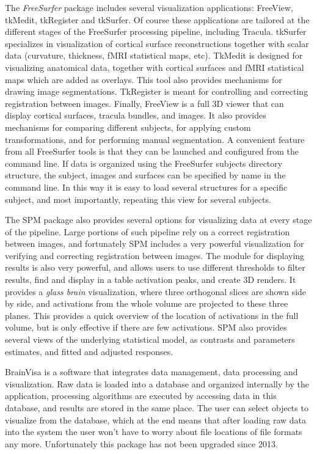 The \emph{FreeSurfer} package includes several visualization applications: FreeView, tkMedit, tkRegister and tkSurfer. Of course these applications are tailored at the different stages of the FreeSurfer processing pipeline, including Tracula. tkSurfer specializes in visualization of cortical surface reconstructions together with scalar data (curvature, thickness, fMRI statistical maps, etc). TkMedit is designed for visualizing anatomical data, together with cortical surfaces and fMRI statistical maps which are added as overlays. This tool also provides mechanisms for drawing image segmentations. TkRegister is meant for controlling and correcting registration between images. Finally, FreeView is a full 3D viewer that can display cortical surfaces, tracula bundles, and images. It also provides mechanisms for comparing different subjects, for applying custom transformations, and for performing manual segmentation. A convenient feature from all FreeSurfer tools is that they can be launched and configured from the command line. If data is organized using the FreeSurfer subjects directory structure, the subject, images and surfaces can be specified by name in the command line. In this way it is easy to load several structures for a specific subject, and most importantly, repeating this view for several subjects. 


The SPM package also provides several options for visualizing data at every stage of the pipeline. Large portions of such pipeline rely on a correct registration between images, and fortunately SPM includes a very powerful visualization for verifying and correcting registration between images. The module for displaying results is also very powerful, and allows users to use different thresholds to filter results, find and display in a table activation peaks, and create 3D renders. It provides a \emph{glass brain} visualization, where three orthogonal slices are shown side by side, and activations from the whole volume are projected to these three planes. This provides a quick overview of the location of activations in the full volume, but is only effective if there are few activations. SPM also provides several views of the underlying statistical model, as contrasts and parameters estimates, and fitted and adjusted responses.


BrainVisa \autocite{cointepas_brainvisa:_2001} is a software that integrates data management, data processing and visualization. Raw data is loaded into a database and organized internally by the application, processing algorithms are executed by accessing data in this database, and results are stored in the same place. The user can select objects to visualize from the database, which at the end means that after loading raw data into the system the user won't have to worry about file locations of file formats any more. Unfortunately this package has not been upgraded since 2013.

